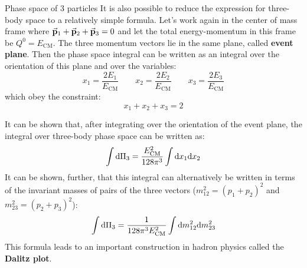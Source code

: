 \documentclass[../../main/main.tex]{subfiles}
\begin{document}
\medskip
\begin{example}{Phase space of 3 particles}{}
	It is also possible to reduce the expression for three-body space to a relatively simple formula. Let's work again in the center of mass frame where \( \va{p}_1 + \va{p}_2 + \va{p}_3 = 0 \) and let the total energy-momentum in this frame be \( Q^0 = E_\mathrm{CM} \). The three momentum vectors lie in the same plane, called \textbf{event plane}. Then the phase space integral can be written as an integral over the orientation of this plane and over the variables:
	\[
		x_1 = \frac{2E_1}{E_\mathrm{CM}}
		\qquad
		x_2 = \frac{2E_2}{E_\mathrm{CM}}
		\qquad
		x_3 = \frac{2E_3}{E_\mathrm{CM}}
	\]
	which obey the constraint:
	\[
		x_1 + x_2 + x_3 = 2
	\]

	It can be shown that, after integrating over the orientation of the event plane, the integral over three-body phase space can be written as:
	\begin{equation}
		\int \mathrm{d}{\Pi_3}
		=
		\frac{E_\mathrm{CM}^2}{128 \pi^3} \int \mathrm{d}{x_1}\mathrm{d}{x_2}
		\label{eq:L03_3PPSI}
	\end{equation}
	It can be shown, further, that this integral can alternatively be written in terms of the invariant masses of pairs of the three vectors (\( m_{12}^2 = (p_1 + p_2)^2 \) and \( m_{23}^2 = (p_2 + p_3)^2 \)):
	\begin{equation}
		\int \mathrm{d}{\Pi_3}
		=
		\frac{1}{128 \pi^3 E_\mathrm{CM}^2} \int \mathrm{d}{m_{12}^2}\mathrm{d}{m_{23}^2}
		\label{eq:L03_3PPSI_2}
	\end{equation}
	This formula leads to an important construction in hadron physics called the \textbf{Dalitz plot}.
\end{example}
\end{document}
